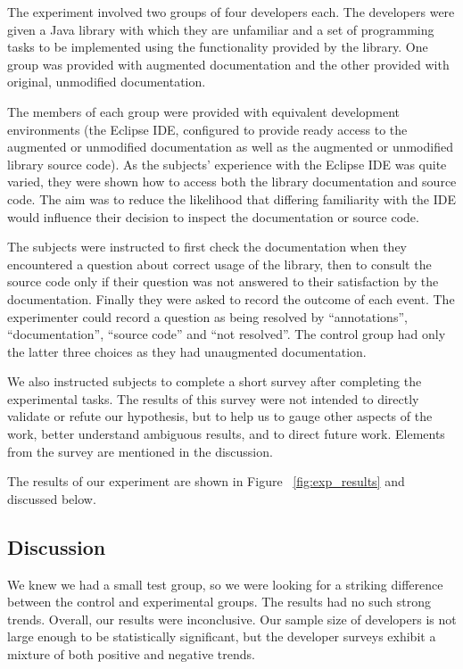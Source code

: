 The experiment involved two groups of four developers each. The developers were
given a Java library with which they are unfamiliar and a set of programming
tasks to be implemented using the functionality provided by the library. One
group was provided with augmented documentation and the other provided with
original, unmodified documentation.

The members of each group were provided with equivalent development
environments (the Eclipse IDE, configured to provide ready access to the
augmented or unmodified documentation as well as the augmented or unmodified
library source code). As the subjects' experience with the Eclipse IDE was
quite varied, they were shown how to access both the library documentation and
source code. The aim was to reduce the likelihood that differing familiarity
with the IDE would influence their decision to inspect the documentation or
source code.

The subjects were instructed to first check the documentation when they
encountered a question about correct usage of the library, then to consult the
source code only if their question was not answered to their satisfaction by
the documentation. Finally they were asked to record the outcome of each event.
The experimenter could record a question as being resolved by ``annotations'',
``documentation'', ``source code'' and ``not resolved''. The control group had
only the latter three choices as they had unaugmented documentation.

We also instructed subjects to complete a short survey after completing the
experimental tasks. The results of this survey were not intended to directly
validate or refute our hypothesis, but to help us to gauge other aspects of the
work, better understand ambiguous results, and to direct future work. Elements
from the survey are mentioned in the discussion.

The results of our experiment are shown in Figure ~\ref{fig:exp_results} and
discussed below.

\subsection{Discussion}
We knew we had a small test group, so we were looking for a striking difference
between the control and experimental groups.  The results had no such strong
trends.
Overall, our results were inconclusive.  Our sample size of developers is not
large enough to be statistically significant, but the developer surveys exhibit
a mixture of both positive and negative trends.


